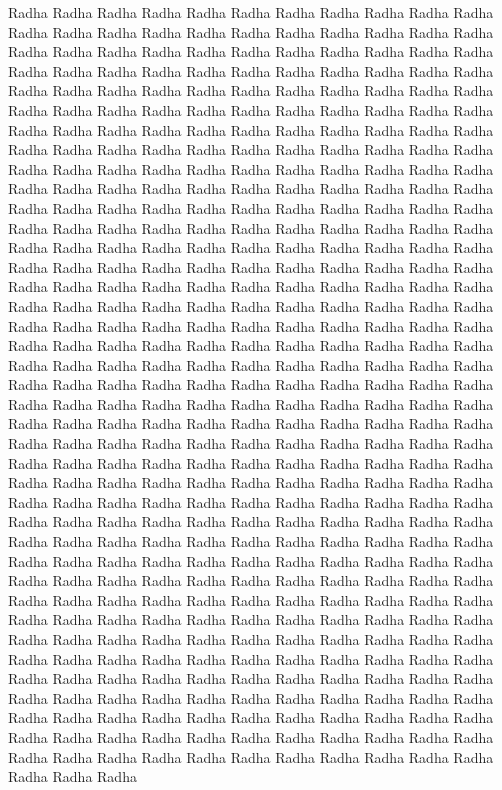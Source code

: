 Radha Radha Radha Radha Radha Radha Radha Radha Radha Radha Radha Radha Radha Radha Radha Radha Radha Radha 
Radha Radha Radha Radha Radha Radha Radha Radha Radha Radha Radha Radha Radha Radha Radha Radha Radha Radha
Radha Radha Radha Radha Radha Radha Radha Radha Radha Radha Radha Radha Radha Radha Radha Radha Radha Radha 
Radha Radha Radha Radha Radha Radha Radha Radha Radha Radha Radha Radha Radha Radha Radha Radha Radha Radha
Radha Radha Radha Radha Radha Radha Radha Radha Radha Radha Radha Radha Radha Radha Radha Radha Radha Radha 
Radha Radha Radha Radha Radha Radha Radha Radha Radha Radha Radha Radha Radha Radha Radha Radha Radha Radha
Radha Radha Radha Radha Radha Radha Radha Radha Radha Radha Radha Radha Radha Radha Radha Radha Radha Radha 
Radha Radha Radha Radha Radha Radha Radha Radha Radha Radha Radha Radha Radha Radha Radha Radha Radha Radha 
Radha Radha Radha Radha Radha Radha Radha Radha Radha Radha Radha Radha Radha Radha Radha Radha Radha Radha 
Radha Radha Radha Radha Radha Radha Radha Radha Radha Radha Radha Radha Radha Radha Radha Radha Radha Radha
Radha Radha Radha Radha Radha Radha Radha Radha Radha Radha Radha Radha Radha Radha Radha Radha Radha Radha     
Radha Radha Radha Radha Radha Radha Radha Radha Radha Radha Radha Radha Radha Radha Radha Radha Radha Radha 
Radha Radha Radha Radha Radha Radha Radha Radha Radha Radha Radha Radha Radha Radha Radha Radha Radha Radha
Radha Radha Radha Radha Radha Radha Radha Radha Radha Radha Radha Radha Radha Radha Radha Radha Radha Radha 
Radha Radha Radha Radha Radha Radha Radha Radha Radha Radha Radha Radha Radha Radha Radha Radha Radha Radha 
Radha Radha Radha Radha Radha Radha Radha Radha Radha Radha Radha Radha Radha Radha Radha Radha Radha Radha
Radha Radha Radha Radha Radha Radha Radha Radha Radha Radha Radha Radha Radha Radha Radha Radha Radha Radha
Radha Radha Radha Radha Radha Radha Radha Radha Radha Radha Radha Radha Radha Radha Radha Radha Radha Radha
Radha Radha Radha Radha Radha Radha Radha Radha Radha Radha Radha Radha Radha Radha Radha Radha Radha Radha
Radha Radha Radha Radha Radha Radha Radha Radha Radha Radha Radha Radha Radha Radha Radha Radha Radha Radha
Radha Radha Radha Radha Radha Radha Radha Radha Radha Radha Radha Radha Radha Radha Radha Radha Radha Radha 
Radha Radha Radha Radha Radha Radha Radha Radha Radha Radha Radha Radha Radha Radha Radha Radha Radha Radha 
Radha Radha Radha Radha Radha Radha Radha Radha Radha Radha Radha Radha Radha Radha Radha Radha Radha Radha
Radha Radha Radha Radha Radha Radha Radha Radha Radha Radha Radha Radha Radha Radha Radha Radha Radha Radha
